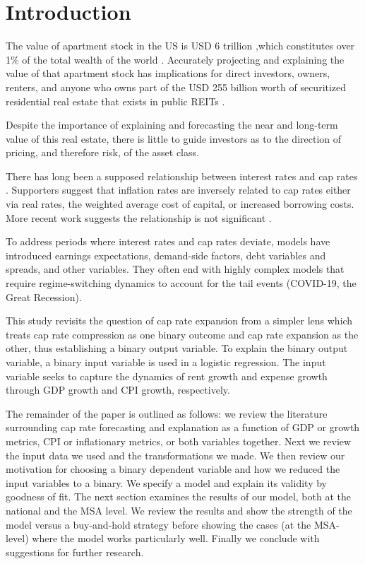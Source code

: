 \documentclass[jrfm,article,accept,oneauthor,pdftex]{Definitions/mdpi}
\begin{document}

\section{Introduction}
The value of apartment stock in the US is USD 6 trillion  \citep*{nmhc},which constitutes over 1\% of the total wealth of the world \citep*{williams_2021}. Accurately projecting and explaining the value of that apartment stock has implications for direct investors, owners, renters, and anyone who owns part of the USD 255 billion worth of securitized residential real estate that exists in public REITs \citep*{nareit_2022}. 

Despite the importance of explaining and forecasting the near and long-term value of this real estate, there is little to guide investors as to the direction of pricing, and therefore risk, of the asset class.

There has long been a supposed relationship between interest rates and cap rates \citep{froland1987determines, sivitanides2001determinants, chandrashekaran2000predictability}. Supporters suggest that inflation rates are inversely related to cap rates either via real rates, the weighted average  cost of capital, or increased borrowing costs. More recent work suggests the relationship is not significant \citep*{larriva2021determinants}. 

To address periods where interest rates and cap rates deviate, models have introduced earnings expectations, demand-side factors, debt variables and spreads, and other variables. They often end with highly complex models that require regime-switching dynamics to account for the tail events (COVID-19, the Great Recession).

This study revisits the question of cap rate expansion from a simpler lens which treats cap rate compression as one binary outcome and cap rate expansion as the other, thus establishing a binary output variable. To explain the binary output variable, a binary input variable is used in a logistic regression. The input variable seeks to capture the dynamics of rent growth and expense growth through GDP growth and CPI growth, respectively. 

The remainder of the paper is outlined as follows: we review the literature surrounding cap rate forecasting and explanation as a function of GDP or growth metrics, CPI or inflationary metrics, or both variables together. Next we review the input data we used and the transformations we made. We then review our motivation for choosing a binary dependent variable and how we reduced the input variables to a binary. %
We specify a model and explain its validity by goodness of fit. The next section examines the results of our model, both at the national and the MSA level. We review the results and show the strength of the model versus a buy-and-hold strategy before showing the cases (at the MSA-level) where the model works particularly well. Finally we conclude with suggestions for further research. 
\end{document}

